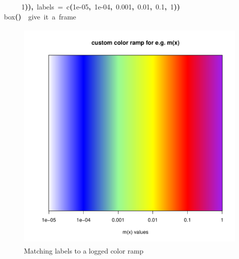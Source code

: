\documentclass[a4paper]{article}
\newcommand{\hlnumber}[1]{\textcolor[rgb]{0.0823529411764706,0.0784313725490196,0.709803921568627}{#1}}%
\newcommand{\hlfunctioncall}[1]{\textcolor[rgb]{1,0,0}{#1}}%
\newcommand{\hlkeyword}[1]{\textcolor[rgb]{0,0,0}{\textbf{#1}}}%
\newcommand{\hlargument}[1]{\textcolor[rgb]{0.694117647058824,0.247058823529412,0.0196078431372549}{#1}}%
\newcommand{\hlcomment}[1]{\textcolor[rgb]{0.8,0.8,0.8}{#1}}%
\newcommand{\hlprompt}[1]{\textcolor[rgb]{0,0,0}{#1}}%
\newcommand{\hlstd}[1]{\textcolor[rgb]{0,0,0}{#1}}%
\newenvironment{Houtput}{\raggedright}{%
%
}
\begin{document}
\begin{Houtput}
\hlstd{}\hlprompt{{\ }}{\ }{\ }{\ }{\ }\hlnumber{1}\hlkeyword{)}\hlkeyword{)}\hlkeyword{,}{\ }\hlargument{labels}{\ }\hlargument{=}{\ }\hlfunctioncall{c}\hlkeyword{(}\hlnumber{1e-05}\hlkeyword{,}{\ }\hlnumber{1e-04}\hlkeyword{,}{\ }\hlnumber{0.001}\hlkeyword{,}{\ }\hlnumber{0.01}\hlkeyword{,}{\ }\hlnumber{0.1}\hlkeyword{,}{\ }\hlnumber{1}\hlkeyword{)}\hlkeyword{)}\mbox{}
\normalfont
\hspace*{\fill}\\
\hlstd{}\ttfamily\noindent
\hlprompt{\usebox{\hlnormalsizeboxgreaterthan}{\ }}\hlfunctioncall{box}\hlkeyword{(}\hlkeyword{)}{\ }{\ }\hlcomment{\usebox{\hlnormalsizeboxhash}{\ }give{\ }it{\ }a{\ }frame}\mbox{}
\normalfont
\hspace*{\fill}\\
\hlstd{}
\end{Houtput}

\begin{figure}[H]
\centering
\includegraphics[width=4.5in,height=4.5in]{figs/colorramp.pdf}
\caption{Matching labels to a logged color ramp}
\end{figure}
\end{document}
